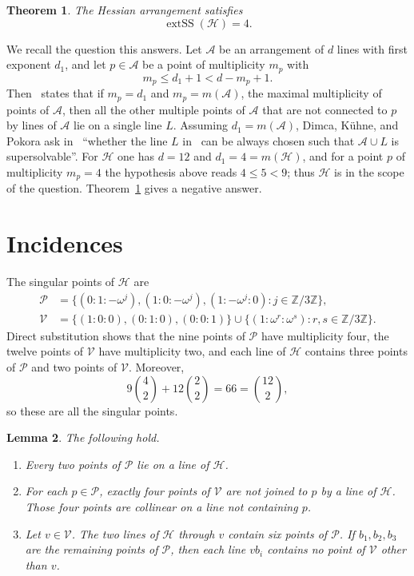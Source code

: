 \documentclass[11pt]{amsart}
\newtheorem{theorem}{Theorem}
\newtheorem{lemma}[theorem]{Lemma}
\newcommand{\extSS}{\operatorname{extSS}}
\begin{document}
\begin{theorem}\label{thm:main}
The Hessian arrangement satisfies
\[
\extSS(\mathcal H)=4.
\]
\end{theorem}

We recall the question this answers. Let $\mathcal A$ be an arrangement
of $d$ lines with first exponent $d_1$, and let $p\in\mathcal A$ be a
point of multiplicity $m_p$ with
\[
m_p\le d_1+1<d-m_p+1 .
\]
Then~\cite[Theorem~1.12(2)]{Dimca} states that if $m_p=d_1$ and
$m_p=m(\mathcal A)$, the maximal multiplicity of points of
$\mathcal A$, then all the other multiple points of $\mathcal A$ that
are not connected to $p$ by lines of $\mathcal A$ lie on a single line
$L$. Assuming $d_1=m(\mathcal A)$, Dimca, K\"uhne, and Pokora ask
in~\cite[Remark~2.3]{DKP} ``whether the line $L$
in~\cite[Theorem~1.12(2)]{Dimca} can be always chosen such that
$\mathcal A\cup L$ is supersolvable''. For $\mathcal H$ one has $d=12$
and $d_1=4=m(\mathcal H)$, and for a
point $p$ of multiplicity $m_p=4$ the hypothesis above reads
$4\le5<9$; thus $\mathcal H$ is in the scope of the question.
Theorem~\ref{thm:main} gives a negative answer.

\section{Incidences}

The singular points of $\mathcal H$ are
\begin{align*}
\mathcal P
 &=\bigl\{(0:1:-\omega^j),(1:0:-\omega^j),(1:-\omega^j:0):
 j\in\mathbb Z/3\mathbb Z\bigr\},\\
\mathcal V
 &=\bigl\{(1:0:0),(0:1:0),(0:0:1)\bigr\}
   \cup
   \bigl\{(1:\omega^r:\omega^s):
   r,s\in\mathbb Z/3\mathbb Z\bigr\}.
\end{align*}
Direct substitution shows that the nine points of $\mathcal P$ have
multiplicity four, the twelve points of $\mathcal V$ have multiplicity
two, and each line of $\mathcal H$ contains three points of
$\mathcal P$ and two points of $\mathcal V$. Moreover,
\[
9\binom42+12\binom22=66=\binom{12}{2},
\]
so these are all the singular points.

\begin{lemma}\label{lem:incidence}
The following hold.
\begin{enumerate}
\item Every two points of $\mathcal P$ lie on a line of $\mathcal H$.
\item For each $p\in\mathcal P$, exactly four points of $\mathcal V$
are not joined to $p$ by a line of $\mathcal H$. Those four points are
collinear on a line not containing $p$.
\item Let $v\in\mathcal V$. The two lines of $\mathcal H$ through $v$
contain six points of $\mathcal P$. If $b_1,b_2,b_3$ are the remaining
points of $\mathcal P$, then each line $vb_i$ contains no point of
$\mathcal V$ other than $v$.
\end{enumerate}
\end{lemma}
\end{document}

